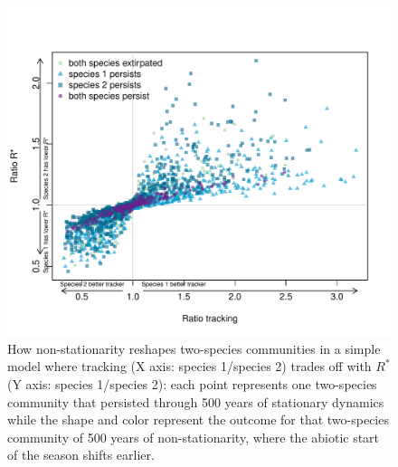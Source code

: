 \documentclass[11pt,letterpaper]{article}
\begin{document}
\begin{figure}[t!]
\centering
\includegraphics[width=1\textwidth]{..//..//R/graphs/modelruns/manuscript/alpharstar.pdf}
\caption{How non-stationarity reshapes two-species communities in a simple model where tracking (X axis: species 1/species 2) trades off with $R^*$ (Y axis: species 1/species 2): each point represents one two-species community that persisted through 500 years of stationary dynamics while the shape and color represent the outcome for that two-species community of 500 years of non-stationarity, where the abiotic start of the season shifts earlier.}
\label{fig:alpharstar}
\end{figure}
\end{document}

